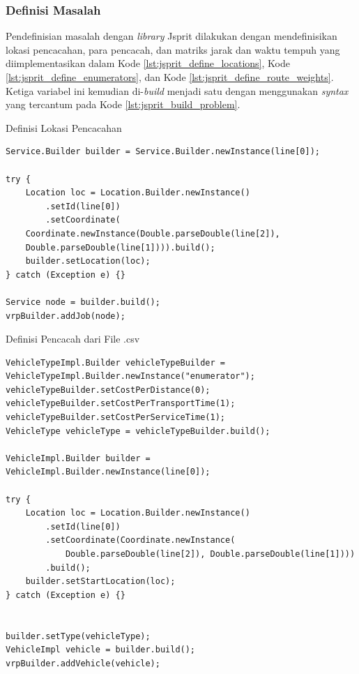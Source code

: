 \subsubsection{Definisi Masalah}
Pendefinisian masalah dengan \textit{library} Jsprit dilakukan dengan mendefinisikan lokasi pencacahan, para pencacah, dan matriks jarak dan waktu tempuh yang diimplementasikan dalam Kode \ref{lst:jsprit_define_locations}, Kode \ref{lst:jsprit_define_enumerators}, dan Kode \ref{lst:jsprit_define_route_weights}. Ketiga variabel ini kemudian di-\textit{build} menjadi satu dengan menggunakan \textit{syntax} yang tercantum pada Kode \ref{lst:jsprit_build_problem}.


\begin{listing}[!]
	\caption{Definisi Lokasi Pencacahan}
	\label{lst:jsprit_define_locations}
	\begin{verbatim}
Service.Builder builder = Service.Builder.newInstance(line[0]);

try {
	Location loc = Location.Builder.newInstance()
		.setId(line[0])
		.setCoordinate(
	Coordinate.newInstance(Double.parseDouble(line[2]), 
	Double.parseDouble(line[1]))).build();
	builder.setLocation(loc);
} catch (Exception e) {}

Service node = builder.build();
vrpBuilder.addJob(node);
	\end{verbatim}
\end{listing}


\begin{listing}[!]
	\caption{Definisi Pencacah dari File .csv}
	\label{lst:jsprit_define_enumerators}
	\begin{verbatim}
VehicleTypeImpl.Builder vehicleTypeBuilder = VehicleTypeImpl.Builder.newInstance("enumerator");
vehicleTypeBuilder.setCostPerDistance(0);
vehicleTypeBuilder.setCostPerTransportTime(1);
vehicleTypeBuilder.setCostPerServiceTime(1);
VehicleType vehicleType = vehicleTypeBuilder.build();

VehicleImpl.Builder builder = VehicleImpl.Builder.newInstance(line[0]);

try {
	Location loc = Location.Builder.newInstance()
		.setId(line[0])
		.setCoordinate(Coordinate.newInstance(
			Double.parseDouble(line[2]), Double.parseDouble(line[1])))
		.build();
	builder.setStartLocation(loc);
} catch (Exception e) {}


builder.setType(vehicleType);
VehicleImpl vehicle = builder.build();
vrpBuilder.addVehicle(vehicle);
	\end{verbatim}
\end{listing}


